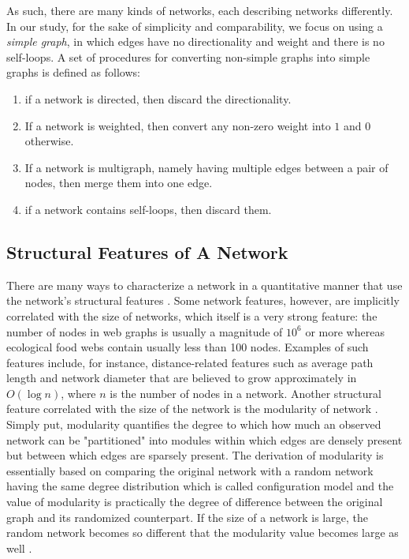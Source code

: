 \documentclass{article}
\begin{document}
	As such, there are many kinds of networks, each describing networks differently. In our study, for the sake of simplicity and comparability, we focus on using a \textit{simple graph}, in which edges have no directionality and weight and there is no self-loops. A set of procedures for converting non-simple graphs into simple graphs is defined as follows:
	
	\begin{enumerate}
		\item if a network is directed, then discard the directionality.
		\item If a network is weighted, then convert any non-zero weight into $1$ and $0$ otherwise.
		\item If a network is multigraph, namely having multiple edges between a pair of nodes, then merge them into one edge.
		\item if a network contains self-loops, then discard them.
	\end{enumerate}
	
	\subsection{Structural Features of A Network}
	There are many ways to characterize a network in a quantitative manner that use the network's structural features \cite{Newman:NetworksIntro,NetworkCharacterizationSurvey}. Some network features, however, are implicitly correlated with the size of networks, which itself is a very strong feature: the number of nodes in web graphs is usually a magnitude of $10^6$ or more whereas ecological food webs contain usually less than 100 nodes. Examples of such features include, for instance, distance-related features such as average path length and network diameter that are believed to grow approximately in $O(\log n)$, where $n$ is the number of nodes in a network. Another structural feature correlated with the size of the network is the modularity of network \cite{Modularity1}. Simply put, modularity quantifies the degree to which how much an observed network can be "partitioned" into modules within which edges are densely present but between which edges are sparsely present. The derivation of modularity is essentially based on comparing the original network with a random network having the same degree distribution which is called configuration model and the value of modularity is practically the degree of difference between the original graph and its randomized counterpart. If the size of a network is large, the random network becomes so different that the modularity value becomes large as well \cite{ResolutionLimit, ModularityLimit}.
	
\end{document}
